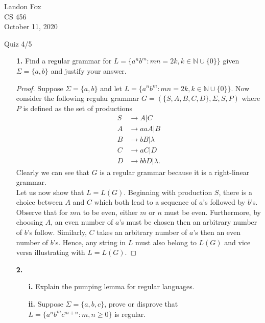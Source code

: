 \documentclass[ 12pt ]{article}
\begin{document}
\noindent Landon Fox \\
\noindent CS 456 \\
\noindent October 11, 2020

\begin{center}
	\Large Quiz 4/5
\end{center}

\begin{enumerate}
	\item[\textbf{1.}] Find a regular grammar for $L = \{ a^n b^m : mn = 2k, k \in \mathbb{N} \cup \{ 0 \} \}$ given $\Sigma = \{ a, b \}$ and justify your answer.

		\begin{proof}
			Suppose $\Sigma = \{ a, b \}$ and let $L =\{ a^n b^m : mn = 2k, k \in \mathbb{N} \cup \{ 0 \} \}$. Now consider the following regular grammar $G = ( \{ S, A, B, C, D \},
			\Sigma, S, P )$ where $P$ is defined as the set of productions
			\begin{align*}
				S &\to A | C \\
				A &\to aaA | B \\
				B &\to bB | \lambda \\
				C &\to aC | D \\
				D &\to bbD | \lambda.
			\end{align*}
			Clearly we can see that $G$ is a regular grammar because it is a right-linear grammar. \\
			Let us now show that $L = L(G)$. Beginning with production $S$, there is a choice between $A$ and $C$ which both lead to a sequence of $a$'s followed by $b$'s. Observe that
			for $mn$ to be even, either $m$ or $n$ must be even. Furthermore, by choosing $A$, an even number of $a$'s must be chosen then an arbitrary number of $b$'s follow. Similarly,
			$C$ takes an arbitrary number of $a$'s then an even number of $b$'s. Hence, any string in $L$ must also belong to $L(G)$ and vice versa illustrating with $L = L(G)$.
		\end{proof}


	\item[\textbf{2.}]
		\begin{enumerate}
			\item[\textbf{i.}] Explain the pumping lemma for regular languages.
			\item[\textbf{ii.}] Suppose $\Sigma = \{ a, b, c \}$, prove or disprove that $L = \{ a^n b^m c^{m + n} : m, n \geq 0 \}$ is regular.
		\end{enumerate}


\end{enumerate}
\end{document}
